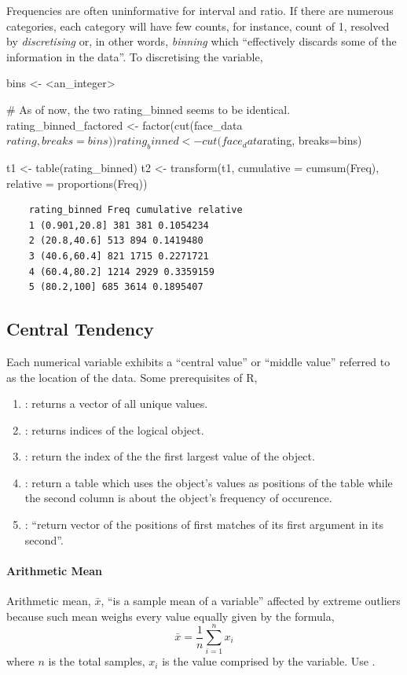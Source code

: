 \label{sec:chapter1/discretising}
Frequencies are often uninformative for interval and ratio. If there are numerous categories, each category will have few counts, for instance, count of 1, resolved by \emph{discretising} or, in other words, 
\emph{binning} which ``effectively discards some of the information in the data''. To discretising the variable,
\begin{Rblock}
    bins <- <an_integer> 

    # As of now, the two rating_binned seems to be identical.
    rating_binned_factored <- factor(cut(face_data$rating, breaks=bins))  
    rating_binned <- cut(face_data$rating, breaks=bins) 

    t1 <- table(rating_binned)
    t2 <- transform(t1, cumulative = cumsum(Freq), relative = proportions(Freq))
\end{Rblock}
\begin{verbatim}
    rating_binned Freq cumulative relative
    1 (0.901,20.8] 381 381 0.1054234
    2 (20.8,40.6] 513 894 0.1419480
    3 (40.6,60.4] 821 1715 0.2271721
    4 (60.4,80.2] 1214 2929 0.3359159
    5 (80.2,100] 685 3614 0.1895407
\end{verbatim}
\subsection{Central Tendency}
Each numerical variable exhibits a ``central value'' or ``middle value'' referred to as the location of the data. Some prerequisites of R,
\begin{enumerate}
    \item {}: returns a vector of all unique values.
    \item {}: returns indices of the logical object.
    \item {}: return the index of the the first largest value of the object.
    \item {}: return a table which uses the object's values as positions of the table while the second column is about the object's frequency of occurence.
    \item {}: ``return vector of the positions of first matches of its first argument in its second''.
\end{enumerate}
\paragraph{Arithmetic Mean}
    Arithmetic mean, $\bar{x}$, ``is a sample mean of a variable'' affected by extreme outliers because such mean weighs every value equally given by the formula,
    \begin{equation}
        \bar{x}=\frac{1}{n}\sum_{i=1}^{n} x_i
    \end{equation}
    where $n$ is the total samples, $x_i$ is the value comprised by the variable. Use .
